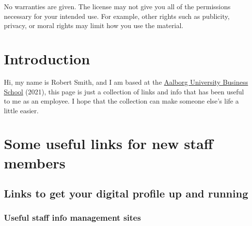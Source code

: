 \documentclass[
]{book}
\begin{document}
No warranties are given. The license may not give you all of the permissions necessary for your intended use. For example, other rights such as publicity, privacy, or moral rights may limit how you use the material.

\hypertarget{introduction}{%
\chapter{Introduction}\label{introduction}}

Hi, my name is Robert Smith, and I am based at the \href{https://www.business.aau.dk}{Aalborg University Business School} (2021), this page is just a collection of links and info that has been useful to me as an employee. I hope that the collection can make someone else's life a little easier.

\hypertarget{some-useful-links-for-new-staff-members}{%
\chapter{Some useful links for new staff members}\label{some-useful-links-for-new-staff-members}}

\hypertarget{links-to-get-your-digital-profile-up-and-running}{%
\section{Links to get your digital profile up and running}\label{links-to-get-your-digital-profile-up-and-running}}

\hypertarget{useful-staff-info-management-sites}{%
\subsection{Useful staff info management sites}\label{useful-staff-info-management-sites}}
\end{document}
